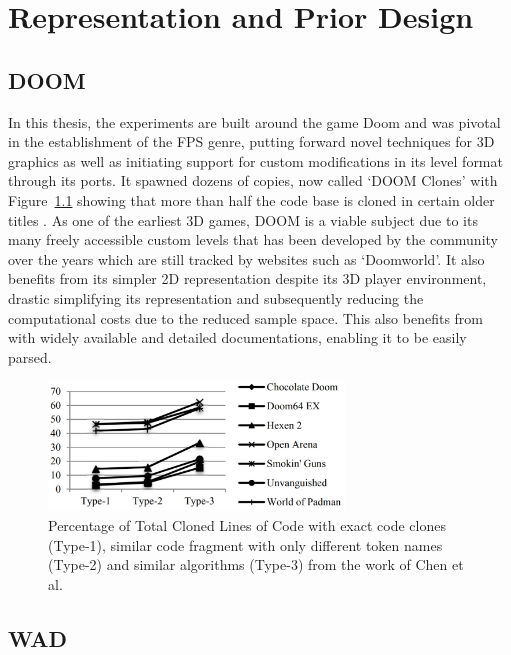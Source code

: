 \documentclass{Configuration_Files/PoliMi3i_thesis}
\begin{document}
\chapter{Representation and Prior Design}
\label{ch:representation and prior design}%

\section{DOOM}
In this thesis, the experiments are built around the game Doom \cite{IdS93} and was pivotal in 
the establishment of the FPS genre, putting forward novel techniques for 3D graphics as well as 
initiating support for custom modifications in its level format through its ports. It spawned 
dozens of copies, now called  ‘DOOM Clones’ with Figure~\ref{fig:doomclones} showing that more 
than half the code base is cloned in certain older titles \cite{YaC14}. As one of the earliest 3D games, 
DOOM is a viable subject due to its many freely accessible custom levels that has been developed by 
the community over the years which are still tracked by websites such as ‘Doomworld’. It also benefits 
from its simpler 2D representation despite its 3D player environment, drastic simplifying its representation 
and subsequently reducing the computational costs due to the reduced sample space. This also benefits 
from with widely available and detailed documentations, enabling it to be easily parsed.
\begin{figure}[H]
    \centering
    \includegraphics[width=0.7\textwidth]{doom_clones.jpg}
    \caption[Cloned lines of code for C-based from the work of Chen et al.]{Percentage of Total Cloned Lines of Code with exact code clones (Type-1), similar code fragment with only different token names (Type-2) and similar algorithms (Type-3) from the work of Chen et al.}
    \label{fig:doomclones}
\end{figure}

\section{WAD}
\end{document}
